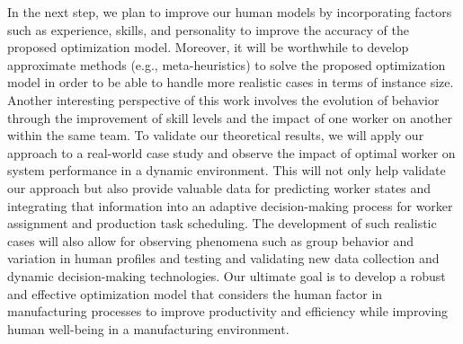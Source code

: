 \documentclass[review,12pt, 3p, times]{elsarticle}
\begin{document}
In the next step, we plan to improve our human  models by incorporating factors such as experience, skills, and personality to improve the accuracy of the proposed optimization model.
Moreover, it will be worthwhile to develop approximate methods (e.g., meta-heuristics) to solve the proposed optimization model in order to be able to handle more realistic cases in terms of instance size.
Another interesting perspective of this work involves the evolution of behavior through the improvement of skill levels and the impact of one worker on another within the same team.
To validate our theoretical results, we will apply our approach to a real-world case study and observe the impact of optimal worker  on system performance in a dynamic environment. This will not only help validate our approach but also provide valuable data for predicting worker states and integrating that information into an adaptive decision-making process for worker assignment and production task scheduling. The development of such realistic cases will also allow for observing phenomena such as group behavior and variation in human profiles and testing and validating new data collection and dynamic decision-making technologies.
Our ultimate goal is to develop a robust and effective optimization model that considers the human factor in manufacturing processes to improve productivity and efficiency while improving human well-being in a manufacturing environment.
	

% 
%  
\end{document}
